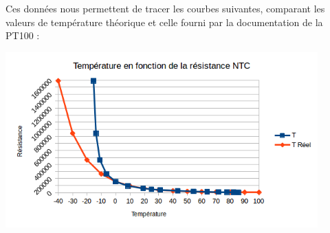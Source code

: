 \documentclass[a4paper,12pt]{article}
\begin{document}
			\par Ces données nous permettent de tracer les courbes suivantes, comparant les valeurs de température théorique et celle fourni par la documentation de la PT100 :
			\begin{center}
				\includegraphics[width=12cm]{../Images/GraphNTC.png}
			\end{center}
\end{document}
